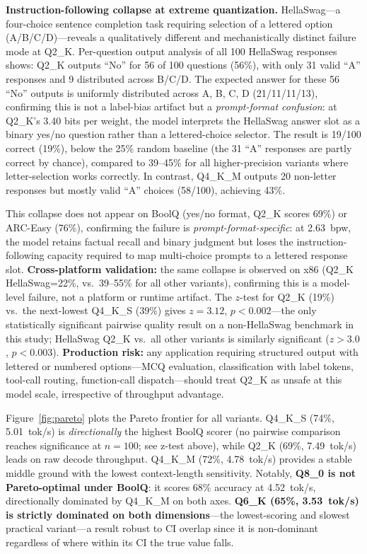 \documentclass[conference]{IEEEtran}
\begin{document}
\textbf{Instruction-following collapse at extreme quantization.}
HellaSwag---a four-choice sentence completion task requiring selection of a lettered
option (A/B/C/D)---reveals a qualitatively different and mechanistically distinct
failure mode at Q2\_K.
Per-question output analysis of all 100 HellaSwag responses shows:
Q2\_K outputs ``No'' for 56 of 100 questions (56\%), with only 31 valid ``A''
responses and 9 distributed across B/C/D.
The expected answer for these 56 ``No'' outputs is uniformly distributed across
A, B, C, D (21/11/11/13), confirming this is not a label-bias artifact but a
\emph{prompt-format confusion}: at Q2\_K's 3.40 bits per weight, the model
interprets the HellaSwag answer slot as a binary yes/no question rather than
a lettered-choice selector.
The result is 19/100 correct (19\%), below the 25\% random baseline (the 31 ``A''
responses are partly correct by chance), compared to 39--45\% for all
higher-precision variants where letter-selection works correctly.
In contrast, Q4\_K\_M outputs 20 non-letter responses but mostly valid ``A''
choices (58/100), achieving 43\%.

This collapse does not appear on BoolQ (yes/no format, Q2\_K scores 69\%)
or ARC-Easy (76\%), confirming the failure is \emph{prompt-format-specific}:
at 2.63~bpw, the model retains factual recall and binary judgment but loses
the instruction-following capacity required to map multi-choice prompts to
a lettered response slot.
\textbf{Cross-platform validation:} the same collapse is observed on x86 (Q2\_K
HellaSwag=22\%, vs.\ 39--55\% for all other variants), confirming this is a
model-level failure, not a platform or runtime artifact.
The $z$-test for Q2\_K (19\%) vs.\ the next-lowest Q4\_K\_S (39\%) gives
$z{=}3.12$, $p{<}0.002$---the only statistically significant pairwise quality
result on a non-HellaSwag benchmark in this study; HellaSwag Q2\_K vs.\
all other variants is similarly significant ($z{>}3.0$, $p{<}0.003$).
\textbf{Production risk:} any application requiring structured output with
lettered or numbered options---MCQ evaluation, classification with label
tokens, tool-call routing, function-call dispatch---should treat Q2\_K as
unsafe at this model scale, irrespective of throughput advantage.

Figure~\ref{fig:pareto} plots the Pareto frontier for all variants.
Q4\_K\_S (74\%, 5.01~tok/s) is \emph{directionally} the highest BoolQ scorer
(no pairwise comparison reaches significance at $n{=}100$; see z-test above),
while Q2\_K (69\%, 7.49~tok/s) leads on raw decode throughput.
Q4\_K\_M (72\%, 4.78~tok/s) provides a stable middle ground with the lowest
context-length sensitivity.
Notably, \textbf{Q8\_0 is not Pareto-optimal under BoolQ}: it scores 68\%
accuracy at 4.52~tok/s, directionally dominated by Q4\_K\_M on both axes.
\textbf{Q6\_K (65\%, 3.53~tok/s) is strictly dominated on both dimensions}---the
lowest-scoring and slowest practical variant---a result robust to CI overlap since
it is non-dominant regardless of where within its CI the true value falls.
\end{document}
